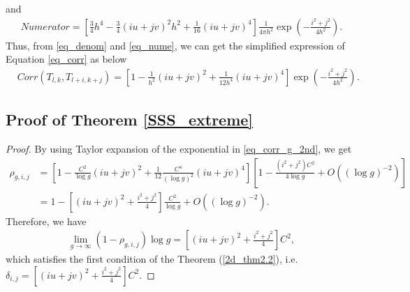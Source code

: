 \documentclass{article}
\begin{document}
\begin{appendices}
\begin{equation*}
	\end{equation*}
	and
	\begin{equation}
		\label{eq_nume}
		\begin{aligned}
			Numerator		=[\frac{3}{4}h^4-\frac{3}{4}(iu+jv)^2h^2+\frac{1}{16}(iu+jv)^4]\frac{1}{4\pi h^2}\exp(-\frac{i^2+j^2}{4h^2}).
		\end{aligned}
	\end{equation}
	Thus, from \ref{eq_denom} and \ref{eq_nume}, we can get the simplified expression of Equation \ref{eq_corr} as below
	\begin{equation*}
		\label{eq_corr_value}
		\begin{aligned}
			&Corr(T_{l,k},T_{l+i,k+j})=[1-\frac{1}{h^2}(iu+jv)^2+\frac{1}{12h^4}(iu+jv)^4]\exp(-\frac{i^2+j^2}{4h^2}).
		\end{aligned}
	\end{equation*}
	\subsection{Proof of Theorem \ref{SSS_extreme}}
	\label{proof_2nd_thm}
	\begin{proof}
		By using Taylor expansion of the exponential in \eqref{eq_corr_g_2nd}, we get
		\begin{equation}
			\label{eq_rho_taylor}
			\begin{aligned}
				\rho_{g,i,j}&= [1-\frac{C^2}{\log g}(iu+jv)^2+\frac{1}{12}\frac{C^4}{(\log g)^2}(iu+jv)^4][1-\frac{(i^2+j^2)C^2}{4\log g}+O((\log g)^{-2})]\\
				&=1-[(iu+jv)^2+\frac{i^2+j^2}{4}]\frac{C^2}{\log g}+O((\log g)^{-2}).
			\end{aligned}
		\end{equation}
		Therefore, we have
		\begin{equation*}
			\begin{aligned}
				\lim_{g\rightarrow\infty}(1-\rho_{g,i,j})\log g=[(iu+jv)^2+\frac{i^2+j^2}{4}]C^2,
			\end{aligned}
		\end{equation*}
		which satisfies the first condition of the Theorem (\ref{2d_thm2.2}), i.e. $\delta_{i,j}=[(iu+jv)^2+\frac{i^2+j^2}{4}]C^2$.
		

\end{proof}
\end{appendices}
\end{document}
